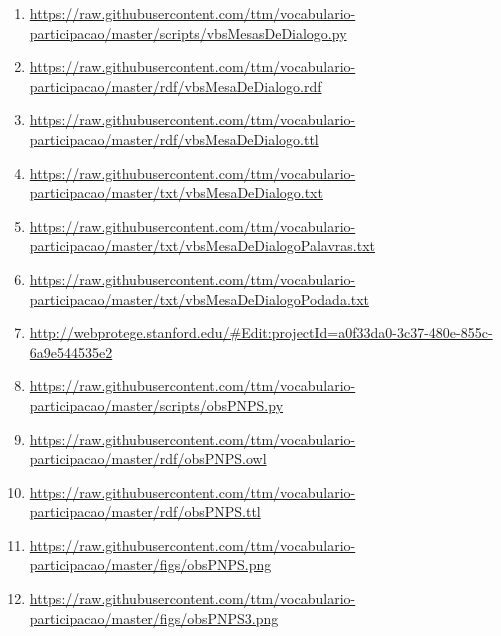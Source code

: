 \documentclass[12pt]{article}
\begin{document}
{\begin{enumerate}
\item \url{https://raw.githubusercontent.com/ttm/vocabulario-participacao/master/scripts/vbsMesasDeDialogo.py}        \label{i:64}
    \item \url{https://raw.githubusercontent.com/ttm/vocabulario-participacao/master/rdf/vbsMesaDeDialogo.rdf}        \label{i:65}
    \item \url{https://raw.githubusercontent.com/ttm/vocabulario-participacao/master/rdf/vbsMesaDeDialogo.ttl}        \label{i:66}
    \item \url{https://raw.githubusercontent.com/ttm/vocabulario-participacao/master/txt/vbsMesaDeDialogo.txt}        \label{i:67}
    \item \url{https://raw.githubusercontent.com/ttm/vocabulario-participacao/master/txt/vbsMesaDeDialogoPalavras.txt}\label{i:68}
    \item \url{https://raw.githubusercontent.com/ttm/vocabulario-participacao/master/txt/vbsMesaDeDialogoPodada.txt}  \label{i:69}
    \item \url{http://webprotege.stanford.edu/#Edit:projectId=a0f33da0-3c37-480e-855c-6a9e544535e2}  \label{i:69wp}

 \item \url{https://raw.githubusercontent.com/ttm/vocabulario-participacao/master/scripts/obsPNPS.py} \label{i:70}
    \item  \url{https://raw.githubusercontent.com/ttm/vocabulario-participacao/master/rdf/obsPNPS.owl}\label{i:71}
    \item  \url{https://raw.githubusercontent.com/ttm/vocabulario-participacao/master/rdf/obsPNPS.ttl}\label{i:72}
    \item \url{https://raw.githubusercontent.com/ttm/vocabulario-participacao/master/figs/obsPNPS.png}\label{i:73}
    \item \url{https://raw.githubusercontent.com/ttm/vocabulario-participacao/master/figs/obsPNPS3.png}\label{i:75}


\end{enumerate}}
\end{document}

